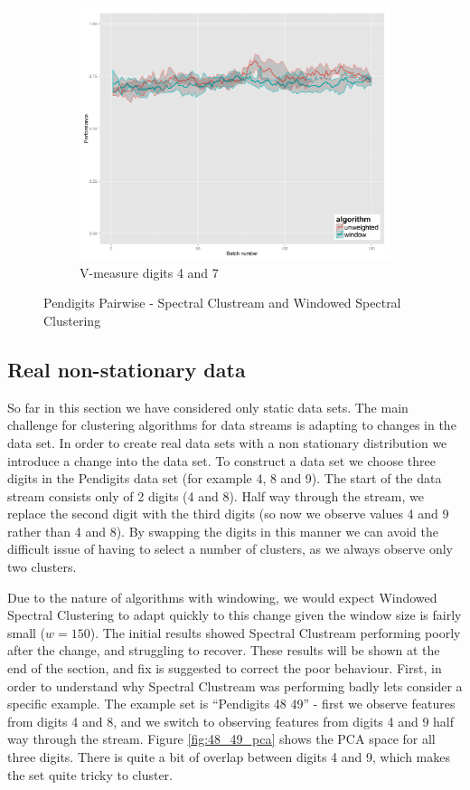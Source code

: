 \begin{figure}[H]
\begin{subfigure}{.3\textwidth}
  \includegraphics[width=\linewidth]{pendigits_2_alg/uci_pendigits_47_ci_one_size_vmeasure.png}
  \caption{V-measure digits 4 and 7}
\end{subfigure}
\caption{Pendigits Pairwise - Spectral Clustream and Windowed Spectral Clustering}
\label{fig:uci_pendigits}
\end{figure}

\subsection{Real non-stationary data}

So far in this section we have considered only static data sets. The main challenge for clustering algorithms for data streams is adapting to changes in the data set. In order to create real data sets with a non stationary distribution we introduce a change into the data set. To construct a data set we choose three digits in the Pendigits data set (for example 4, 8 and 9). The start of the data stream consists only of 2 digits (4 and 8). Half way through the stream, we replace  the second digit with the third digits (so now we observe values 4 and 9 rather than 4 and 8). By swapping the digits in this manner we can avoid the difficult issue of having to select a number of clusters, as we always observe only two clusters. 

Due to the nature of algorithms with windowing, we would expect Windowed Spectral Clustering to adapt quickly to this change given the window size is fairly small ($w = 150$). The initial results showed Spectral Clustream performing poorly after the change, and struggling to recover. These results will be shown at the end of the section, and fix is suggested to correct the poor behaviour. First, in order to understand why Spectral Clustream was performing badly lets consider a specific example. 
The example set is ``Pendigits 48 49'' - first we observe features from digits 4 and 8, and we switch to observing features from digits 4 and 9 half way through the stream. Figure \ref{fig:48_49_pca} shows the PCA space for all  three digits. There is quite a bit of overlap between digits 4 and 9, which makes the set quite tricky to cluster. 

